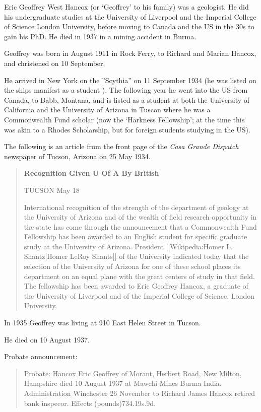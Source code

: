 
Eric Geoffrey West Hancox (or `Geoffrey' to his family) was a geologist. He did his undergraduate studies at the University of Liverpool and the Imperial College of Science London University, before moving to Canada and the US in the 30s to gain his PhD. He died in 1937 in a mining accident in Burma.

Geoffrey was born in August 1911 \cite{EGWHbirth} in Rock Ferry, to Richard and Marian Hancox, and christened on 10 September.\cite{EGWHchristening}

He arrived in New York on the ''Scythia'' on 11 September 1934 (he was listed on the ships manifest as a student \cite{Scythia}). The following year he went into the US from Canada, to Babb, Montana, and is listed as a student at both the University of California and the University of Arizona in Tuscon \cite{EGWHborder} where he was a Commonwealth Fund scholar (now the `Harkness Fellowship'; at the time this was akin to a Rhodes Scholarship, but for foreign students studying in the US).

The following is an article from the front page of the \emph{Casa Grande Dispatch} newspaper of Tucson, Arizona on 25 May 1934. \cite{CasaP1}

\begin{quotation}
\textbf{Recognition Given U Of A By British}

TUCSON May 18

International recognition of the strength of the department of geology at the University of Arizona and of the wealth of field research opportunity in the state has come through the announcement that a Commonwealth Fund Fellowship has been awarded to an English student for specific graduate study at the University of Arizona. President [[Wikipedia:Homer L. Shantz|Homer LeRoy Shants]] of the University indicated today that the selection of the University of Arizona for one of these school places its department on an equal plane with the great centers of study in that field. The fellowship has been awarded to Eric Geoffrey Hancox, a graduate of the University of Liverpool and of the Imperial College of Science, London University.
\end{quotation}

In 1935 Geoffrey was living at 910 East Helen Street in Tucson.\cite{USCities}

He died on 10 August 1937.

Probate announcement:
\begin{quotation}
Probate: Hancox Eric Geoffrey of Morant, Herbert Road, New Milton, Hampshire died 10 August 1937 at Mawchi Mines Burma India. Administration Winchester 26 November to Richard James Hancox retired bank inspecor. Effects (pounds)734.19s.9d.
\end{quotation}

